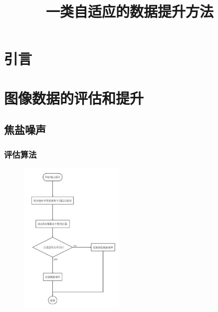 \documentclass{beamer}
\title{一类自适应的数据提升方法}
\author{}
\date{}
\begin{document}
\maketitle

\section{引言}

\section{图像数据的评估和提升}

\subsection{焦盐噪声}


  

\begin{frame}
  \frametitle{评估算法}
 \begin{figure}
    \centering
    \includegraphics[width=0.45\textwidth]{1.jpg}
    \end{figure}
\end{frame}
\end{document}
